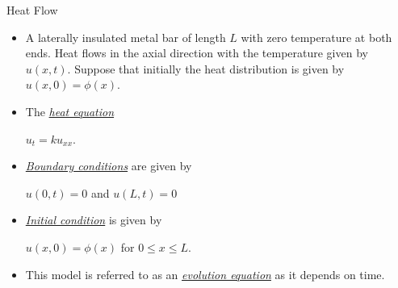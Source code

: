 \documentclass[t,10pt,fleqn]{beamer}
\newcommand{\tu}[1]{\underline{\textit{#1}}}
\begin{document}
\begin{frame}

\begin{block}{Heat Flow}
\begin{itemize}
    \pause
      \item  A laterally insulated metal bar of length $L$ with zero temperature at both ends.  Heat flows in the axial direction with the temperature given by $u(x,t)$.  Suppose that initially the heat distribution is given by $u(x,0) = \phi(x)$.
          \pause
      \item The \tu{heat equation} 
      \begin{center}
            $u_t = k u_{xx}$.
      \end{center}
         \pause
      \item \tu{Boundary conditions} are given by
            \begin{center}
            $u(0,t)= 0$ and $u(L,t)= 0$
      \end{center}
               \pause
      \item \tu{Initial condition} is given by
            \begin{center}
            $u(x,0)= \phi(x)$ for $0 \leq x \leq L$.
      \end{center}
        \pause
      \item This model is referred to as an \tu{evolution equation} as it depends on time. 
      
       \end{itemize}
  \end{block}
  
 \end{frame}
\end{document}

